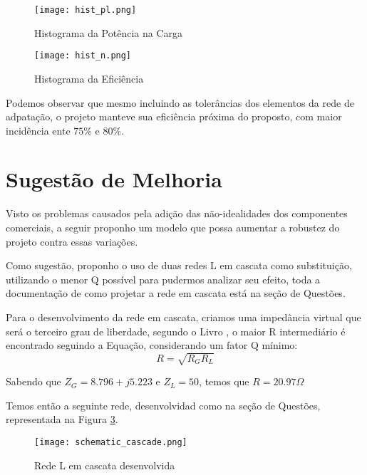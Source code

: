 \documentclass[a4paper,12pt]{proc}
\begin{document}
\begin{figure}[htbp]
    \centering
    \texttt{[image: hist\_pl.png]}
    \caption{Histograma da Potência na Carga}
    \label{hist_pl}
\end{figure}

\begin{figure}[htbp]
    \centering
    \texttt{[image: hist\_n.png]}
    \caption{Histograma da Eficiência}
    \label{hist_n}
\end{figure}

\noindent Podemos observar que mesmo incluindo as tolerâncias dos elementos da rede de adpatação, o projeto manteve sua eficiência próxima do proposto, com maior incidência ente $75\%$ e $80\%$. 

\section{Sugestão de Melhoria}

\noindent Visto os problemas causados pela adição das não-idealidades dos componentes comerciais, a seguir proponho um modelo que possa aumentar a robustez do projeto contra essas variações.

\singlespacing

\noindent Como sugestão, proponho o uso de duas redes L em cascata como substituição, utilizando o menor Q possível para pudermos analizar seu efeito, toda a documentação de como projetar a rede em cascata está na seção de Questões. 

\singlespacing

\noindent Para o desenvolvimento da rede em cascata, criamos uma impedância virtual que será o terceiro grau de liberdade, segundo o Livro \cite{Orfanidis2003}, o maior R intermediário é encontrado seguindo a Equação, considerando um fator Q mínimo:
\[R = \sqrt{R_{G}R_{L}} \]

\noindent Sabendo que $Z_{G} = 8.796 + j5.223$ e $Z_{L} = 50$, temos que $R = 20.97 \Omega$

\singlespacing

\noindent Temos então a seguinte rede, desenvolvidad como na seção de Questões, representada na Figura \ref{rede_cascade}.

\begin{figure}[htbp]
    \centering
    \texttt{[image: schematic\_cascade.png]}
    \caption{Rede L em cascata desenvolvida}
    \label{rede_cascade}
\end{figure}
\end{document}
